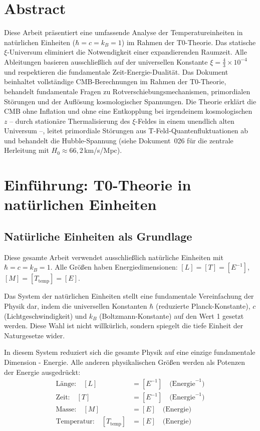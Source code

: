 \section*{Abstract}
		Diese Arbeit präsentiert eine umfassende Analyse der Temperatureinheiten in natürlichen Einheiten ($\hbar = c = k_B = 1$) im Rahmen der T0-Theorie. Das statische $\xi$-Universum eliminiert die Notwendigkeit einer expandierenden Raumzeit. Alle Ableitungen basieren ausschließ{}lich auf der universellen Konstante $\xi = \frac{4}{3} \times 10^{-4}$ und respektieren die fundamentale Zeit-Energie-Dualität. Das Dokument beinhaltet vollständige CMB-Berechnungen im Rahmen der T0-Theorie, behandelt fundamentale Fragen zu Rotverschiebungsmechanismen, primordialen Störungen und der Auflösung kosmologischer Spannungen. Die Theorie erklärt die CMB ohne Inflation und ohne eine Entkopplung bei irgendeinem kosmologischen $z$ -- durch stationäre Thermalisierung des $\xi$-Feldes in einem unendlich alten Universum --, leitet primordiale Störungen aus T-Feld-Quantenfluktuationen ab und behandelt die Hubble-Spannung (siehe Dokument~026 für die zentrale Herleitung mit $H_0 \approx 66{,}2\,$km/s/Mpc).

	
	
	\section{Einführung: T0-Theorie in natürlichen Einheiten}
	
	\subsection{Natürliche Einheiten als Grundlage}
	
	\begin{important}
		Diese gesamte Arbeit verwendet ausschließ{}lich natürliche Einheiten mit $\hbar = c = k_B = 1$. Alle Größ{}en haben Energiedimensionen: $[L] = [T] = [E^{-1}]$, $[M] = [T_{\text{temp}}] = [E]$.
	\end{important}
	
	Das System der natürlichen Einheiten stellt eine fundamentale Vereinfachung der Physik dar, indem die universellen Konstanten $\hbar$ (reduzierte Planck-Konstante), $c$ (Lichtgeschwindigkeit) und $k_B$ (Boltzmann-Konstante) auf den Wert 1 gesetzt werden. Diese Wahl ist nicht willkürlich, sondern spiegelt die tiefe Einheit der Naturgesetze wider.
	
	In diesem System reduziert sich die gesamte Physik auf eine einzige fundamentale Dimension - Energie. Alle anderen physikalischen Größ{}en werden als Potenzen der Energie ausgedrückt:
	\begin{align}
		\text{Länge:} \quad [L] &= [E^{-1}] \quad \text{(Energie}^{-1}\text{)} \\
		\text{Zeit:} \quad [T] &= [E^{-1}] \quad \text{(Energie}^{-1}\text{)} \\
		\text{Masse:} \quad [M] &= [E] \quad \text{(Energie)} \\
		\text{Temperatur:} \quad [T_{\text{temp}}] &= [E] \quad \text{(Energie)}
	\end{align}
	
